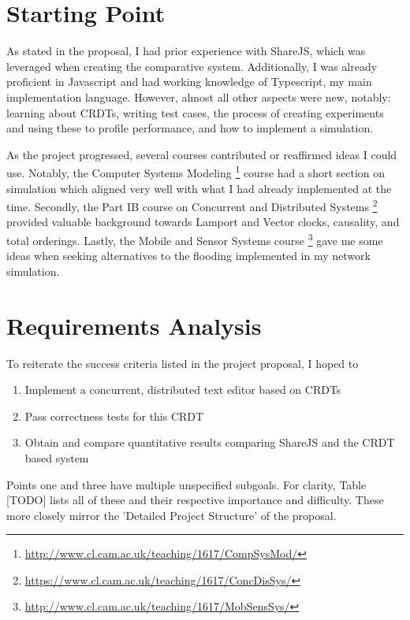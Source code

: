 \documentclass[12pt,a4paper,twoside,openright]{report}
\begin{document}
\section{Starting Point}

As stated in the proposal, I had prior experience with ShareJS, which was leveraged when creating the comparative system. Additionally, I was already proficient in Javascript and had working knowledge of Typescript, my main implementation language. However, almost all other aspects were new, notably: learning about CRDTs, writing test cases, the process of creating experiments and using these to profile performance, and how to implement a simulation.

As the project progressed, several courses contributed or reaffirmed ideas I could use. Notably, the Computer Systems Modeling \footnote{\url{http://www.cl.cam.ac.uk/teaching/1617/CompSysMod/}} course had a short section on simulation which aligned very well with what I had already implemented at the time. Secondly, the Part IB course on Concurrent and Distributed Systems \footnote{\url{https://www.cl.cam.ac.uk/teaching/1617/ConcDisSys/}} provided valuable background towards Lamport and Vector clocks, causality, and total orderings. Lastly, the Mobile and Sensor Systems course \footnote{\url{http://www.cl.cam.ac.uk/teaching/1617/MobSensSys/}} gave me some ideas when seeking alternatives to the flooding implemented in my network simulation.

\section{Requirements Analysis}
To reiterate the success criteria listed in the project proposal, I hoped to

\begin{enumerate}
\item Implement a concurrent, distributed text editor based on CRDTs 
\item Pass correctness tests for this CRDT
\item Obtain and compare quantitative results comparing ShareJS and the CRDT based system
\end{enumerate}

Points one and three have multiple unspecified subgoals. For clarity, Table [TODO] lists all of these and their respective importance and difficulty. These more closely mirror the 'Detailed Project Structure' of the proposal.
\end{document}

